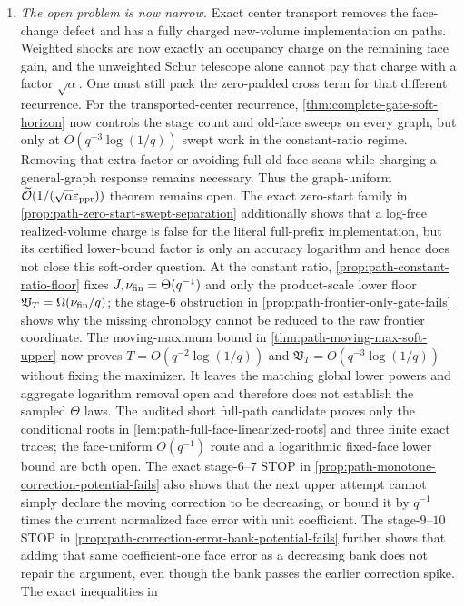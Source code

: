 \begin{enumerate}[leftmargin=2em]
\item \emph{The open problem is now narrow.}
Exact center transport removes the face-change defect and has a fully charged
new-volume implementation on paths.  Weighted shocks are now exactly an
occupancy charge on the remaining face gain, and the unweighted Schur
telescope alone cannot pay that charge with a factor $\sqrt\alpha$.  One must
still pack the zero-padded cross term for that different recurrence.  For the
transported-center recurrence, \cref{thm:complete-gate-soft-horizon} now
controls the stage count and old-face sweeps on every graph, but only at
$O(q^{-3}\log(1/q))$ swept work in the constant-ratio regime.  Removing that
extra factor or avoiding full old-face scans while charging a general-graph
response remains necessary.  Thus the graph-uniform
$\widetilde{\mathcal{O}}(1/(\sqrt\alpha\varepsilon_{\mathrm{ppr}}))$ theorem remains open.
The exact zero-start family in
\cref{prop:path-zero-start-swept-separation} additionally shows that a
log-free realized-volume charge is false for the literal full-prefix
implementation, but its certified lower-bound factor is only an accuracy
logarithm and hence does not close this soft-order question.  At the constant
ratio, \cref{prop:path-constant-ratio-floor} fixes
$J,\nu_{\rm fin}=\Theta(q^{-1})$ and only the product-scale lower floor
$\mathfrak V_T=\Omega(\nu_{\rm fin}/q)$; the stage-$6$ obstruction in
\cref{prop:path-frontier-only-gate-fails} shows why the missing chronology
cannot be reduced to the raw frontier coordinate.  The moving-maximum bound
in \cref{thm:path-moving-max-soft-upper} now proves
$T=O(q^{-2}\log(1/q))$ and
$\mathfrak V_T=O(q^{-3}\log(1/q))$ without fixing the maximizer.  It leaves
the matching global lower powers and aggregate logarithm removal open and
therefore does not establish the sampled $\Theta$ laws.  The audited short
full-path candidate proves only the conditional roots in
\cref{lem:path-full-face-linearized-roots} and three finite exact traces; the
face-uniform $O(q^{-1})$ route and a logarithmic fixed-face lower bound are
both open.  The exact stage-$6$--$7$ STOP in
\cref{prop:path-monotone-correction-potential-fails} also shows that the next
upper attempt cannot simply declare the moving correction to be decreasing,
or bound it by $q^{-1}$ times the current normalized face error with unit
coefficient.  The stage-$9$--$10$ STOP in
\cref{prop:path-correction-error-bank-potential-fails} further shows that
adding that same coefficient-one face error as a decreasing bank does not
repair the argument, even though the bank passes the earlier correction
spike.  The exact inequalities in

\end{enumerate}
